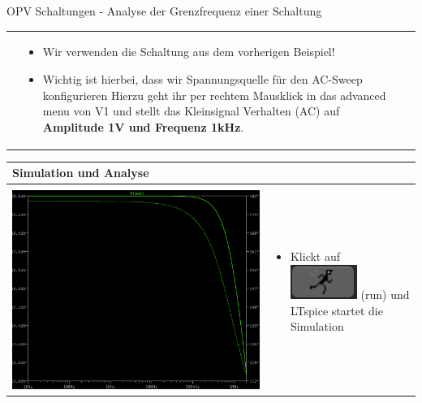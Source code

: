 \begin{frame}[t]{OPV Schaltungen - Analyse der Grenzfrequenz einer Schaltung }
\begin{spacing}{0.9}
\begin{tiny}
\begin{table}[h!]
\begin{tabular}{p{2cm} p{2cm} p{6cm}}
\begin{minipage}{.2\textwidth}
            \end{minipage} 
            & 
            \begin{minipage}{.5\textwidth}
            \begin{itemize}
              \item Wir verwenden die Schaltung aus dem vorherigen Beispiel!
              \item Wichtig ist hierbei, dass wir Spannungsquelle für den AC-Sweep konfigurieren
              Hierzu geht ihr per rechtem Mausklick in das advanced menu von V1 und stellt das Kleinsignal Verhalten (AC)
              auf \textbf{Amplitude 1V und Frequenz 1kHz}.
            \end{itemize}
            \end{minipage} 
            \\
          \end{tabular}
          \begin{tabular}{p{6cm} p{4cm}}
            \hline
            \textbf{Simulation und Analyse} & \\
            \hline \\
            \begin{minipage}{.6\textwidth}
              \includegraphics[width=0.7\linewidth]{pictures/analysis_6.png}
            \end{minipage} 
            & 
            \begin{minipage}{.4\textwidth}
            \begin{itemize}
              \item Klickt auf \includegraphics[scale=0.3]{pictures/run.png} (run) und LTspice startet die Simulation

\end{itemize}
\end{minipage}
\end{tabular}
\end{table}
\end{tiny}
\end{spacing}
\end{frame}
